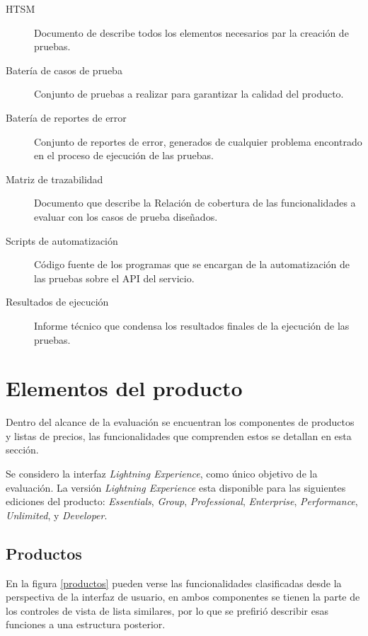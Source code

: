 \begin{description}
\item [HTSM] Documento de describe todos los elementos necesarios par la creación
    de pruebas.
\item [Batería de casos de prueba] Conjunto de pruebas a realizar para garantizar
    la calidad del producto.
\item [Batería de reportes de error] Conjunto de reportes de error, generados de
    cualquier problema encontrado en el proceso de ejecución de las pruebas.
\item [Matriz de trazabilidad] Documento que describe la Relación de cobertura
    de las funcionalidades a evaluar con los casos de prueba diseñados.
\item [Scripts de automatización] Código fuente de los programas que se encargan
    de la automatización de las pruebas sobre el API del servicio.
\item [Resultados de ejecución] Informe técnico que condensa los resultados
    finales de la ejecución de las pruebas.
\end{description}

\section{Elementos del producto}
Dentro del alcance de la evaluación se encuentran los componentes de productos
y listas de precios, las funcionalidades que comprenden estos se detallan en
esta sección.

Se considero la interfaz \emph{Lightning Experience}, como único objetivo de la
evaluación. La versión \emph{Lightning Experience} esta disponible para las
siguientes ediciones del producto: \emph{Essentials}, \emph{Group},
\emph{Professional}, \emph{Enterprise}, \emph{Performance}, \emph{Unlimited}, y
\emph{Developer}.

\subsection{Productos}
En la figura \ref{productos} pueden verse las funcionalidades clasificadas desde
la perspectiva de la interfaz de usuario, en ambos componentes se tienen la
parte de los controles de vista de lista similares, por lo que se prefirió
describir esas funciones a una estructura posterior.

